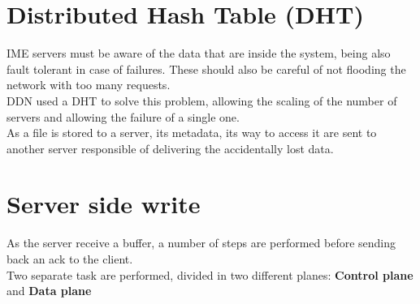 
\section{Distributed Hash Table (DHT)}
IME servers must be aware of the data that are inside the system, being also
fault tolerant in case of failures. These should also be careful of not flooding
the network with too many requests. \\
DDN used a DHT to solve this problem, allowing the scaling of the number of
servers and allowing the failure of a single one. \\
As a file is stored to a server, its metadata, its way to access it are sent to
another server responsible of delivering the accidentally lost data.

\section{Server side write}
As the server receive a buffer, a number of steps are performed before sending
back an ack to the client. \\ Two separate task are performed, divided in two
different planes: \textbf{Control plane} and \textbf{Data plane}

